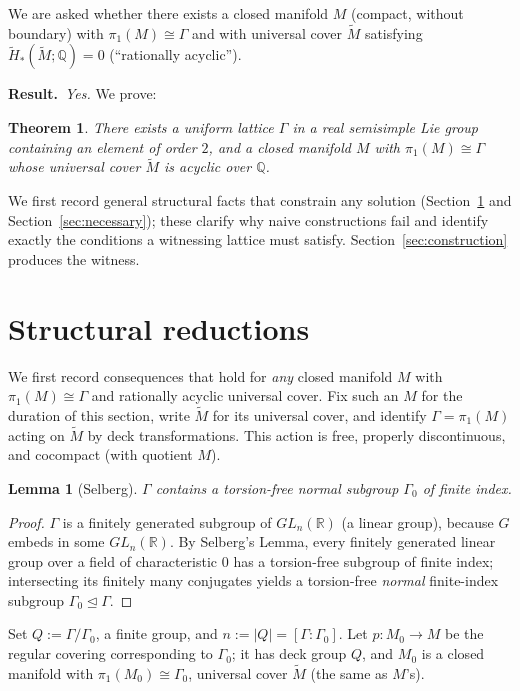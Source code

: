 \documentclass[12pt]{article}
\newcommand{\bR}{\mathbb{R}}
\newcommand{\bQ}{\mathbb{Q}}
\newtheorem{theorem}{Theorem}
\newtheorem{lemma}{Lemma}
\theoremstyle{definition}
\begin{document}
We are asked whether there exists a closed manifold $M$ (compact, without
boundary) with $\pi_1(M)\cong\Gamma$ and with universal cover $\widetilde M$
satisfying $\widetilde H_*(\widetilde M;\bQ)=0$ (``rationally acyclic'').

\medskip
\noindent\textbf{Result.}\ \emph{Yes.}  We prove:

\begin{theorem}\label{thm:main}
There exists a uniform lattice $\Gamma$ in a real semisimple Lie group containing
an element of order $2$, and a closed manifold $M$ with $\pi_1(M)\cong\Gamma$
whose universal cover $\widetilde M$ is acyclic over $\bQ$.
\end{theorem}

We first record general structural facts that constrain any solution
(Section~\ref{sec:reductions} and Section~\ref{sec:necessary}); these clarify why
naive constructions fail and identify exactly the conditions a witnessing lattice
must satisfy.  Section~\ref{sec:construction} produces the witness.

\section{Structural reductions}\label{sec:reductions}

We first record consequences that hold for \emph{any} closed manifold $M$ with
$\pi_1(M)\cong\Gamma$ and rationally acyclic universal cover.  Fix such an $M$ for
the duration of this section, write $\widetilde M$ for its universal cover, and
identify $\Gamma=\pi_1(M)$ acting on $\widetilde M$ by deck transformations.  This
action is free, properly discontinuous, and cocompact (with quotient $M$).

\begin{lemma}[Selberg]\label{lem:selberg}
$\Gamma$ contains a torsion-free normal subgroup $\Gamma_0$ of finite index.
\end{lemma}

\begin{proof}
$\Gamma$ is a finitely generated subgroup of $GL_n(\bR)$ (a linear group),
because $G$ embeds in some $GL_n(\bR)$.  By Selberg's Lemma, every finitely
generated linear group over a field of characteristic $0$ has a torsion-free
subgroup of finite index; intersecting its finitely many conjugates yields a
torsion-free \emph{normal} finite-index subgroup $\Gamma_0\trianglelefteq\Gamma$.
\end{proof}

Set $Q:=\Gamma/\Gamma_0$, a finite group, and $n:=|Q|=[\Gamma:\Gamma_0]$.  Let
$p\colon M_0\to M$ be the regular covering corresponding to $\Gamma_0$; it has
deck group $Q$, and $M_0$ is a closed manifold with $\pi_1(M_0)\cong\Gamma_0$,
universal cover $\widetilde M$ (the same as $M$'s).
\end{document}
